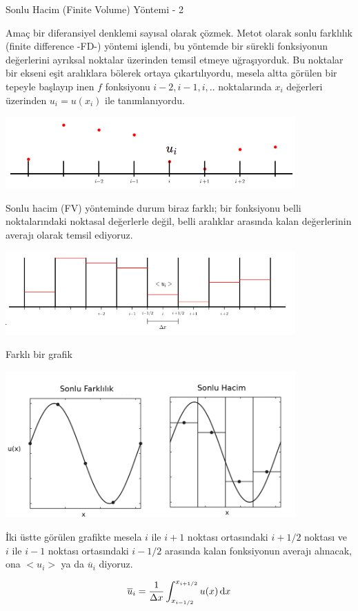 \documentclass[12pt,fleqn]{article}\usepackage{../../common}
\begin{document}
Sonlu Hacim (Finite Volume) Yöntemi - 2

Amaç bir diferansiyel denklemi sayısal olarak çözmek. Metot olarak sonlu
farklılık (finite difference -FD-) yöntemi işlendi, bu yöntemde bir sürekli
fonksiyonun değerlerini ayrıksal noktalar üzerinden temsil etmeye uğraşıyorduk.
Bu noktalar bir ekseni eşit aralıklara bölerek ortaya çıkartılıyordu, mesela
altta görülen bir tepeyle başlayıp inen $f$ fonksiyonu $i-2,i-1,i,..$
noktalarında $x_i$ değerleri üzerinden $u_i = u(x_i)$ ile tanımlanıyordu.

\includegraphics[width=30em]{13-22-29.png}

Sonlu hacim (FV) yönteminde durum biraz farklı; bir fonksiyonu belli
noktalarındaki noktasal değerlerle değil, belli aralıklar arasında kalan
değerlerinin averajı olarak temsil ediyoruz.

\includegraphics[width=30em]{13-22-34.png}

Farklı bir grafik

\includegraphics[width=30em]{13-16-00.png}

İki üstte görülen grafikte mesela $i$ ile $i+1$ noktası ortasındaki $i+1/2$
noktası ve $i$ ile $i-1$ noktası ortasındaki $i-1/2$ arasında kalan fonksiyonun
averajı alınacak, ona $< u_i >$ ya da $\overline{u}_i$ diyoruz.

$$
\overline{u}_i = \frac{1}{\Delta x} \int _{x_{i-1/2}}^{x_{i+1/2}} u(x) \,\mathrm{d} x
$$
\end{document}
